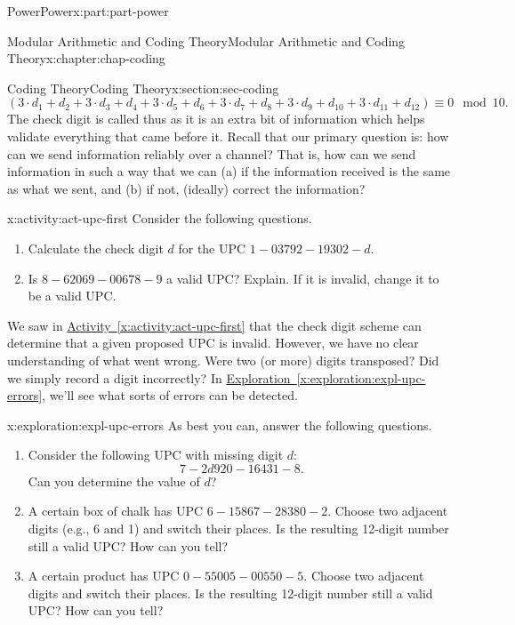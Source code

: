 \documentclass[oneside,10pt,]{book}
\newcommand{\xreffont}{\relax}
\numberwithin{equation}{section}
\begin{document}
\begin{partptx}{Power}{}{Power}{}{}{x:part:part-power}
\begin{chapterptx}{Modular Arithmetic and Coding Theory}{}{Modular Arithmetic and Coding Theory}{}{}{x:chapter:chap-coding}
\begin{sectionptx}{Coding Theory}{}{Coding Theory}{}{}{x:section:sec-coding}
%
\begin{equation*}
(3\cdot d_1 + d_2 + 3\cdot d_3 + d_4 + 3\cdot d_5 + d_6 + 3\cdot d_7 + d_8 + 3\cdot d_9 + d_{10} + 3\cdot d_{11} + d_{12})\equiv 0\mod 10.
\end{equation*}
The check digit is called thus as it is an extra bit of information which helps validate everything that came before it. Recall that our primary question is: how can we send information reliably over a channel? That is, how can we send information in such a way that we can (a) if the information received is the same as what we sent, and (b) if not, (ideally) correct the information?%
\begin{activity}{}{x:activity:act-upc-first}%
Consider the following questions.%
%
\begin{enumerate}
\item{}Calculate the check digit \(d\) for the UPC \(1-03792 -19302-d\).%
\item{}Is \(8-62069-00678-9\) a valid UPC? Explain. If it is invalid, change it to be a valid UPC.%
\end{enumerate}
\end{activity}%
We saw in \hyperref[x:activity:act-upc-first]{Activity~{\xreffont\ref{x:activity:act-upc-first}}} that the check digit scheme can determine that a given proposed UPC is invalid. However, we have no clear understanding of what went wrong. Were two (or more) digits transposed? Did we simply record a digit incorrectly? In \hyperref[x:exploration:expl-upc-errors]{Exploration~{\xreffont\ref{x:exploration:expl-upc-errors}}}, we'll see what sorts of errors can be detected.%
\begin{exploration}{}{x:exploration:expl-upc-errors}%
As best you can, answer the following questions.%
%
\begin{enumerate}
\item{}Consider the following UPC with missing digit \(d\):%
\begin{equation*}
7-2d920-16431-8.
\end{equation*}
Can you determine the value of \(d\)?%
\item{}A certain box of chalk has UPC \(6-15867-28380-2\). Choose two adjacent digits (e.g., 6 and 1) and switch their places. Is the resulting 12-digit number still a valid UPC? How can you tell?%
\item{}A certain product has UPC \(0-55005-00550-5\). Choose two adjacent digits and switch their places. Is the resulting 12-digit number still a valid UPC? How can you tell?%
\end{enumerate}
\end{exploration}%
\end{sectionptx}
\end{chapterptx}
\end{partptx}
\end{document}
